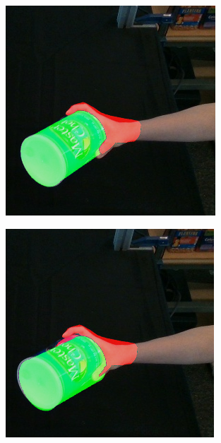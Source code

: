 \begin{figure}[h!]
\begin{subfigure}[b]{0.16\linewidth}
  \end{subfigure}
  \begin{subfigure}[b]{0.16\linewidth}
    \includegraphics[width=0.98\linewidth]{figs/1000_0}
  \end{subfigure}
  \begin{subfigure}[b]{0.16\linewidth}
    \includegraphics[width=0.98\linewidth]{figs/1000_4}

\end{subfigure}
\end{figure}

